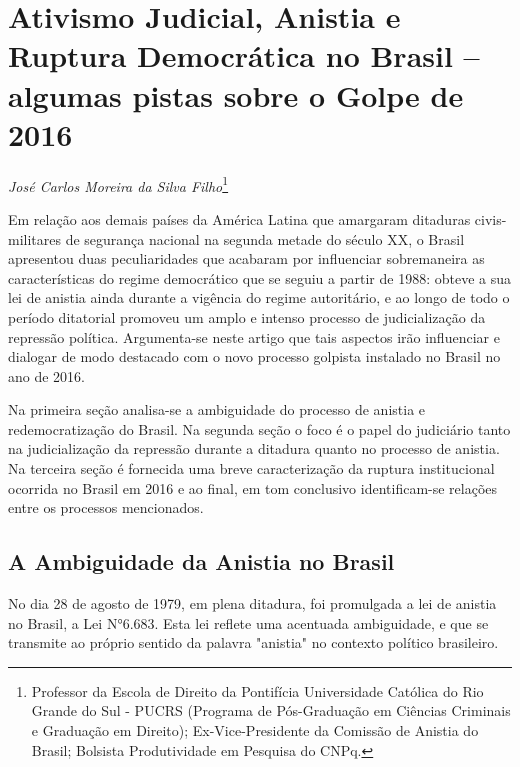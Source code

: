 \chapter{Ativismo Judicial, Anistia e Ruptura Democrática no Brasil --
algumas pistas sobre o Golpe de 2016}

\begin{flushright}
\emph{José Carlos Moreira da Silva Filho}\footnote{Professor da Escola
  de Direito da Pontifícia Universidade Católica do Rio Grande do Sul -
  PUCRS (Programa de Pós-Graduação em Ciências Criminais e Graduação em
  Direito); Ex-Vice-Presidente da Comissão de Anistia do Brasil;
  Bolsista Produtividade em Pesquisa do CNPq.}
\end{flushright}

Em relação aos demais países da América Latina que amargaram ditaduras
civis-militares de segurança nacional na segunda metade do século XX, o
Brasil apresentou duas peculiaridades que acabaram por influenciar
sobremaneira as características do regime democrático que se seguiu a
partir de 1988: obteve a sua lei de anistia ainda durante a vigência do
regime autoritário, e ao longo de todo o período ditatorial promoveu um
amplo e intenso processo de judicialização da repressão política.
Argumenta-se neste artigo que tais aspectos irão influenciar e dialogar
de modo destacado com o novo processo golpista instalado no Brasil no
ano de 2016.

Na primeira seção analisa-se a ambiguidade do processo de anistia e
redemocratização do Brasil. Na segunda seção o foco é o papel do
judiciário tanto na judicialização da repressão durante a ditadura
quanto no processo de anistia. Na terceira seção é fornecida uma breve
caracterização da ruptura institucional ocorrida no Brasil em 2016 e ao
final, em tom conclusivo identificam-se relações entre os processos
mencionados.

\section{A Ambiguidade da Anistia no Brasil}

No dia 28 de agosto de 1979, em plena ditadura, foi promulgada a lei de
anistia no Brasil, a Lei N°6.683. Esta lei reflete uma acentuada
ambiguidade, e que se transmite ao próprio sentido da palavra "anistia"
no contexto político brasileiro.

